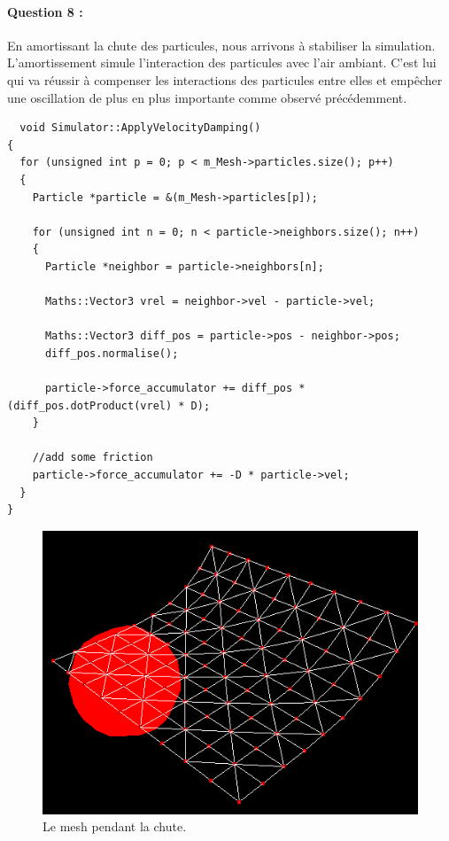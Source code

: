 \documentclass[a4paper,12pt]{article}
\begin{document}
\paragraph{Question 8 :} En amortissant la chute des particules, nous arrivons à stabiliser la simulation. L'amortissement simule l'interaction des particules avec l'air ambiant. C'est lui qui va réussir à compenser les interactions des particules entre elles et empêcher une oscillation de plus en plus importante comme observé précédemment. 
\begin{lstlisting}
  void Simulator::ApplyVelocityDamping()
{
  for (unsigned int p = 0; p < m_Mesh->particles.size(); p++)
  {
    Particle *particle = &(m_Mesh->particles[p]);

    for (unsigned int n = 0; n < particle->neighbors.size(); n++)
    {
      Particle *neighbor = particle->neighbors[n];

      Maths::Vector3 vrel = neighbor->vel - particle->vel;

      Maths::Vector3 diff_pos = particle->pos - neighbor->pos;
      diff_pos.normalise();

      particle->force_accumulator += diff_pos * (diff_pos.dotProduct(vrel) * D);
    }

    //add some friction
    particle->force_accumulator += -D * particle->vel;
  }
}
\end{lstlisting}
\begin{figure}[ht!]
  \centering
  \includegraphics[scale=0.8]{images/rideau_chute.png}
  \caption{Le mesh pendant la chute.}
  \label{fig:rideauFall}
\end{figure}
\end{document}
